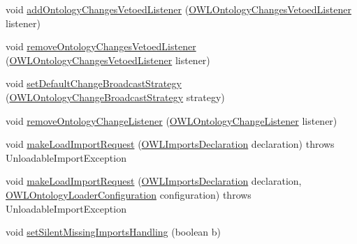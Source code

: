 \begin{DoxyCompactItemize}
void \hyperlink{interfaceorg_1_1semanticweb_1_1owlapi_1_1model_1_1_o_w_l_ontology_manager_a46c28decb2348e9ce33a2bd1696671d4}{add\-Ontology\-Changes\-Vetoed\-Listener} (\hyperlink{interfaceorg_1_1semanticweb_1_1owlapi_1_1model_1_1_o_w_l_ontology_changes_vetoed_listener}{O\-W\-L\-Ontology\-Changes\-Vetoed\-Listener} listener)
\item 
void \hyperlink{interfaceorg_1_1semanticweb_1_1owlapi_1_1model_1_1_o_w_l_ontology_manager_aca5027c969969c4ea92fc4eabb41bd00}{remove\-Ontology\-Changes\-Vetoed\-Listener} (\hyperlink{interfaceorg_1_1semanticweb_1_1owlapi_1_1model_1_1_o_w_l_ontology_changes_vetoed_listener}{O\-W\-L\-Ontology\-Changes\-Vetoed\-Listener} listener)
\item 
void \hyperlink{interfaceorg_1_1semanticweb_1_1owlapi_1_1model_1_1_o_w_l_ontology_manager_aaa484aa5de39c3d05217ef775d9b39ee}{set\-Default\-Change\-Broadcast\-Strategy} (\hyperlink{interfaceorg_1_1semanticweb_1_1owlapi_1_1model_1_1_o_w_l_ontology_change_broadcast_strategy}{O\-W\-L\-Ontology\-Change\-Broadcast\-Strategy} strategy)
\item 
void \hyperlink{interfaceorg_1_1semanticweb_1_1owlapi_1_1model_1_1_o_w_l_ontology_manager_a4bd40f9676943beb4a29ddf68a3929bd}{remove\-Ontology\-Change\-Listener} (\hyperlink{interfaceorg_1_1semanticweb_1_1owlapi_1_1model_1_1_o_w_l_ontology_change_listener}{O\-W\-L\-Ontology\-Change\-Listener} listener)
\item 
void \hyperlink{interfaceorg_1_1semanticweb_1_1owlapi_1_1model_1_1_o_w_l_ontology_manager_acdb310fe4c74378701a2635b50a8d233}{make\-Load\-Import\-Request} (\hyperlink{interfaceorg_1_1semanticweb_1_1owlapi_1_1model_1_1_o_w_l_imports_declaration}{O\-W\-L\-Imports\-Declaration} declaration)  throws Unloadable\-Import\-Exception
\item 
void \hyperlink{interfaceorg_1_1semanticweb_1_1owlapi_1_1model_1_1_o_w_l_ontology_manager_af4fc6adb6deeb3e1705c8868dab1732d}{make\-Load\-Import\-Request} (\hyperlink{interfaceorg_1_1semanticweb_1_1owlapi_1_1model_1_1_o_w_l_imports_declaration}{O\-W\-L\-Imports\-Declaration} declaration, \hyperlink{classorg_1_1semanticweb_1_1owlapi_1_1model_1_1_o_w_l_ontology_loader_configuration}{O\-W\-L\-Ontology\-Loader\-Configuration} configuration)  throws Unloadable\-Import\-Exception
\item 
void \hyperlink{interfaceorg_1_1semanticweb_1_1owlapi_1_1model_1_1_o_w_l_ontology_manager_af82e4600a64d66ad291cb7edc01ccb7e}{set\-Silent\-Missing\-Imports\-Handling} (boolean b)
\item 

\end{DoxyCompactItemize}
